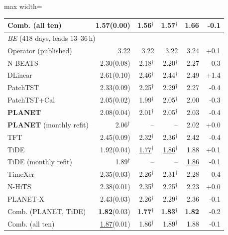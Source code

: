\begin{table}[!t]
\begin{adjustbox}{max width=\linewidth}
\begin{tabular}{lrrrrr}
\quad Comb. (all ten) & \textbf{1.57}{\scriptsize\color{gray}(0.00)} & 1.56$^{\dagger}$ & \textbf{1.57}$^{\dagger}$ & 1.66 & -0.1 \\
\midrule
\multicolumn{6}{l}{\textit{BE} (418 days, leads 13--36\,h)} \\
\quad Operator (published) & 3.22 & 3.22 & 3.22 & 3.24 & +0.1 \\
\quad N-BEATS & 2.30{\scriptsize\color{gray}(0.08)} & 2.18$^{\dagger}$ & 2.20$^{\dagger}$ & 2.27 & -0.3 \\
\quad DLinear & 2.61{\scriptsize\color{gray}(0.10)} & 2.46$^{\dagger}$ & 2.44$^{\dagger}$ & 2.49 & +1.4 \\
\quad PatchTST & 2.33{\scriptsize\color{gray}(0.09)} & 2.25$^{\dagger}$ & 2.29$^{\dagger}$ & 2.27 & -0.4 \\
\quad PatchTST+Cal & 2.05{\scriptsize\color{gray}(0.02)} & 1.99$^{\dagger}$ & 2.05$^{\dagger}$ & 2.00 & -0.3 \\
\quad \textbf{PLANET} & 2.08{\scriptsize\color{gray}(0.04)} & 2.01$^{\dagger}$ & 2.05$^{\dagger}$ & 2.03 & -0.4 \\
\quad \textbf{PLANET} (monthly refit) & 2.06$^{\dagger}$ & -- & -- & 2.02 & +0.0 \\
\quad TFT & 2.45{\scriptsize\color{gray}(0.09)} & 2.32$^{\dagger}$ & 2.36$^{\dagger}$ & 2.42 & -0.4 \\
\quad TiDE & 1.92{\scriptsize\color{gray}(0.04)} & \underline{1.77}$^{\dagger}$ & \underline{1.86}$^{\dagger}$ & 1.88 & +0.1 \\
\quad TiDE (monthly refit) & 1.89$^{\dagger}$ & -- & -- & \underline{1.86} & -0.1 \\
\quad TimeXer & 2.35{\scriptsize\color{gray}(0.03)} & 2.26$^{\dagger}$ & 2.31$^{\dagger}$ & 2.28 & -0.4 \\
\quad N-HiTS & 2.38{\scriptsize\color{gray}(0.01)} & 2.35$^{\dagger}$ & 2.25$^{\dagger}$ & 2.23 & +0.0 \\
\quad PLANET-X & 2.43{\scriptsize\color{gray}(0.03)} & 2.26$^{\dagger}$ & 2.29$^{\dagger}$ & 2.36 & -0.1 \\
\quad Comb. (PLANET, TiDE) & \textbf{1.82}{\scriptsize\color{gray}(0.03)} & \textbf{1.77}$^{\dagger}$ & \textbf{1.83}$^{\dagger}$ & \textbf{1.82} & -0.2 \\
\quad Comb. (all ten) & \underline{1.87}{\scriptsize\color{gray}(0.01)} & 1.86$^{\dagger}$ & 1.89$^{\dagger}$ & 1.88 & -0.1 \\
\bottomrule
\end{tabular}
\end{adjustbox}
\end{table}
